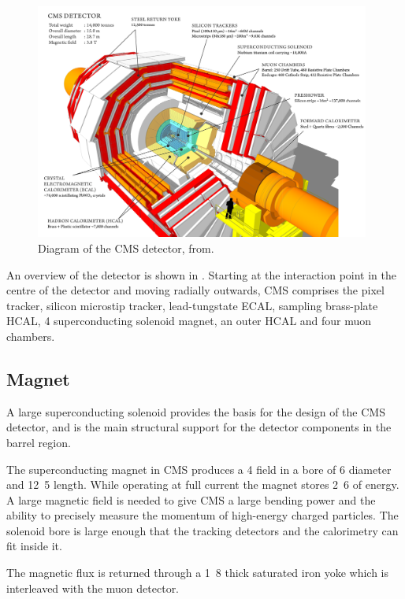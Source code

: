 \begin{figure}[htbp]
  \centering
  \includegraphics[width=0.98\textwidth]{cms_su.png}
  \caption{Diagram of the CMS detector, from\cite{sketchup}.}
  \label{fig:CMSnc}
\end{figure}

An overview of the detector is shown in .  Starting at the
interaction point in the centre of the detector and moving radially outwards,
CMS comprises the pixel tracker, silicon microstip tracker, lead-tungstate ECAL,
sampling brass-plate HCAL, \unit{4}{\tesla} superconducting solenoid magnet, an
outer HCAL and four muon chambers.

\subsection{Magnet}
A large superconducting solenoid provides the basis for the design of the CMS
detector, and is the main structural support for the detector components in the
barrel region.

The superconducting magnet in CMS produces a \unit{4}{\tesla} field in a bore of
\unit{6}{\meter} diameter and \unit{12.5}{\meter} length.  While operating at
full current the magnet stores \unit{2.6}{\giga\joule} of energy.  A large
magnetic field is needed to give CMS a large bending power and the ability to
precisely measure the momentum of high-energy charged particles.  The solenoid
bore is large enough that the tracking detectors and the calorimetry can fit
inside it.\cite{cms}

The magnetic flux is returned through a \unit{1.8}{\meter} thick saturated iron
yoke which is interleaved with the muon detector.

